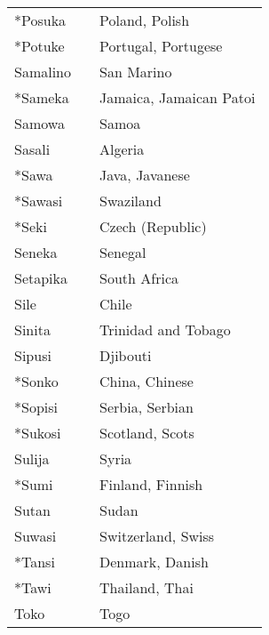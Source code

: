 \begin{supertabular}{p{4,5cm}|ll}
    *Posuka                    &  & Poland, Polish                  \\
    *Potuke                    &  & Portugal, Portugese             \\
    Samalino                   &  & San Marino                      \\
    *Sameka                    &  & Jamaica, Jamaican Patoi         \\
    Samowa                     &  & Samoa                           \\
    Sasali                     &  & Algeria                         \\
    *Sawa                      &  & Java, Javanese                  \\
    *Sawasi                    &  & Swaziland                       \\
    *Seki                      &  & Czech (Republic)                \\
    Seneka                     &  & Senegal                         \\
    Setapika                   &  & South Africa                    \\
    Sile                       &  & Chile                           \\
    Sinita                     &  & Trinidad and Tobago             \\
    Sipusi                     &  & Djibouti                        \\
    *Sonko                     &  & China, Chinese                  \\
    *Sopisi                    &  & Serbia, Serbian                 \\
    *Sukosi                    &  & Scotland, Scots                 \\
    Sulija                     &  & Syria                           \\
    *Sumi                      &  & Finland, Finnish                \\
    Sutan                      &  & Sudan                           \\
    Suwasi                     &  & Switzerland, Swiss              \\
    *Tansi                     &  & Denmark, Danish                 \\
    *Tawi                      &  & Thailand, Thai                  \\
    Toko                       &  & Togo                            \\

\end{supertabular}
